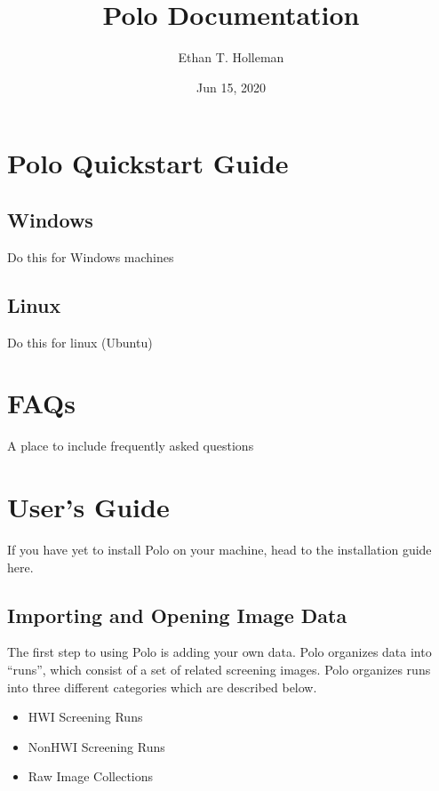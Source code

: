 \documentclass[letterpaper,10pt,english]{sphinxmanual}
\title{Polo Documentation}
\date{Jun 15, 2020}
\author{Ethan T. Holleman}
\begin{document}
\pagestyle{empty}
\sphinxmaketitle
\pagestyle{plain}
\sphinxtableofcontents
\pagestyle{normal}
\label{\detokenize{index::doc}}



\chapter{Polo Quickstart Guide}
\label{\detokenize{Quickstart:polo-quickstart-guide}}\label{\detokenize{Quickstart::doc}}

\section{Windows}
\label{\detokenize{Quickstart:windows}}
Do this for Windows machines


\section{Linux}
\label{\detokenize{Quickstart:linux}}
Do this for linux (Ubuntu)


\chapter{FAQs}
\label{\detokenize{FAQS:faqs}}\label{\detokenize{FAQS::doc}}
A place to include frequently asked questions


\chapter{User’s Guide}
\label{\detokenize{user_guide:user-s-guide}}\label{\detokenize{user_guide::doc}}
If you have yet to install Polo on your machine, head to the installation
guide here.


\section{Importing and Opening Image Data}
\label{\detokenize{user_guide:importing-and-opening-image-data}}
The first step to using Polo is adding your own data. Polo organizes data into “runs”, which
consist of a set of related screening images. Polo organizes runs into three different
categories which are described below.
\begin{itemize}
\item {} 
HWI Screening Runs

\item {} 
Non\sphinxhyphen{}HWI Screening Runs

\item {} 
Raw Image Collections

\end{itemize}
\end{document}
